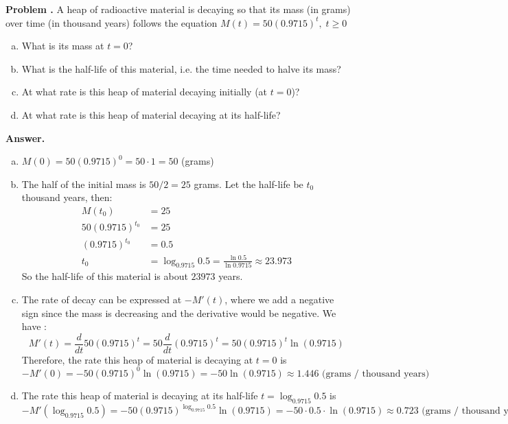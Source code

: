 \documentclass[11pt,letterpaper]{article}
\newcounter{problem}
\newcommand{\problem}{
	\stepcounter{problem}%
	\noindent \textbf{Problem \theproblem. }%
}
\newcommand{\answer}{\noindent \textbf{Answer. }}
\begin{document}
\problem A heap of radioactive material is decaying so that its mass (in grams) over time (in thousand years) follows the equation $M(t) = 50 (0.9715)^t, \; t \ge 0$
\begin{enumerate}[(a)]
    \item What is its mass at $t = 0$?
    \item What is the half-life of this material, i.e. the time needed to halve its mass?
    \item At what rate is this heap of material decaying initially (at $t=0$)?
    \item At what rate is this heap of material decaying at its half-life?
\end{enumerate}\vspace{6mm}

\answer
\begin{enumerate}[(a)]
    \item $M(0) = 50 (0.9715)^0 = 50 \cdot 1 = 50$ (grams)
    \item The half of the initial mass is $50/2 = 25$ grams.  Let the half-life be $t_0$ thousand years, then:
    \begin{align*}
        M(t_0) &= 25\\
        50(0.9715)^{t_0} &= 25\\
        (0.9715)^{t_0} &= 0.5\\
        t_0 &= \log_{0.9715}0.5 = \frac{\ln 0.5}{\ln 0.9715} \approx 23.973
    \end{align*}
    So the half-life of this material is about $23973$ years.
    \item The rate of decay can be expressed at $-M'(t)$, where we add a negative sign since the mass is decreasing and the derivative would be negative.  We have :
    \[M'(t) = \frac{d}{dt}50(0.9715)^t = 50\frac{d}{dt}(0.9715)^t = 50 (0.9715)^t \ln (0.9715)\]
    Therefore, the rate this heap of material is decaying at $t=0$ is 
    \[-M'(0) = -50 (0.9715)^0 \ln(0.9715) = - 50 \ln(0.9715) \approx 1.446 \text{ (grams / thousand years)}\]
    \item The rate this heap of material is decaying at its half-life $t=\log_{0.9715}0.5$ is
    \[-M'(\log_{0.9715}0.5) = -50 (0.9715)^{\log_{0.9715}0.5} \ln(0.9715) = - 50 \cdot 0.5 \cdot \ln(0.9715) \approx 0.723 \text{ (grams / thousand years)}\]
\end{enumerate}\vspace{6mm}
\end{document}
